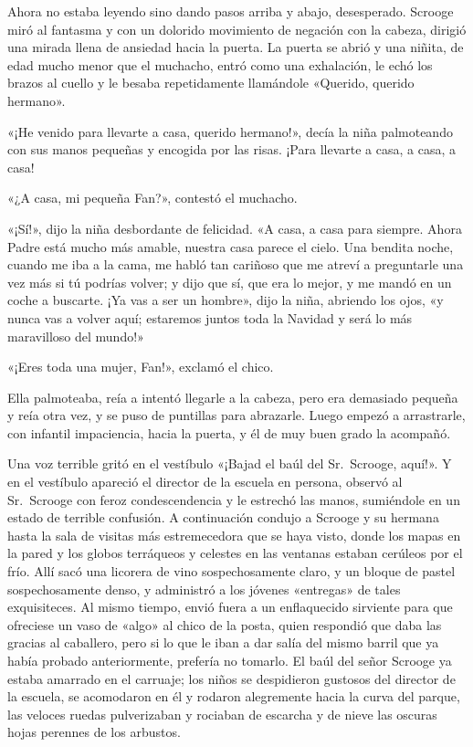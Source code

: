 \documentclass{novela}
\begin{document}
 Ahora no estaba leyendo sino dando pasos arriba y abajo, desesperado. Scrooge miró al fantasma y con un dolorido movimiento de negación con la cabeza, dirigió una mirada llena de ansiedad hacia la puerta. La puerta se abrió y una niñita, de edad mucho menor que el muchacho, entró como una exhalación, le echó los brazos al cuello y le besaba repetidamente llamándole «Querido, querido hermano».

 «¡He venido para llevarte a casa, querido hermano!», decía la niña palmoteando con sus manos pequeñas y encogida por las risas. ¡Para llevarte a casa, a casa, a casa!

 «¿A casa, mi pequeña Fan?», contestó el muchacho.

 «¡Sí!», dijo la niña desbordante de felicidad. «A casa, a casa para siempre. Ahora Padre está mucho más amable, nuestra casa parece el cielo. Una bendita noche, cuando me iba a la cama, me habló tan cariñoso que me atreví a preguntarle una vez más si tú podrías volver; y dijo que sí, que era lo mejor, y me mandó en un coche a buscarte. ¡Ya vas a ser un hombre», dijo la niña, abriendo los ojos, «y nunca vas a volver aquí; estaremos juntos toda la Navidad y será lo más maravilloso del mundo!»

 «¡Eres toda una mujer, Fan!», exclamó el chico.

 Ella palmoteaba, reía a intentó llegarle a la cabeza, pero era demasiado pequeña y reía otra vez, y se puso de puntillas para abrazarle. Luego empezó a arrastrarle, con infantil impaciencia, hacia la puerta, y él de muy buen grado la acompañó.

 Una voz terrible gritó en el vestíbulo «¡Bajad el baúl del Sr.~Scrooge, aquí!». Y en el vestíbulo apareció el director de la escuela en persona, observó al Sr.~Scrooge con feroz condescendencia y le estrechó las manos, sumiéndole en un estado de terrible confusión. A continuación condujo a Scrooge y su hermana hasta la sala de visitas más estremecedora que se haya visto, donde los mapas en la pared y los globos terráqueos y celestes en las ventanas estaban cerúleos por el frío. Allí sacó una licorera de vino sospechosamente claro, y un bloque de pastel sospechosamente denso, y administró a los jóvenes «entregas» de tales exquisiteces. Al mismo tiempo, envió fuera a un enflaquecido sirviente para que ofreciese un vaso de «algo» al chico de la posta, quien respondió que daba las gracias al caballero, pero si lo que le iban a dar salía del mismo barril que ya había probado anteriormente, prefería no tomarlo. El baúl del señor Scrooge ya estaba amarrado en el carruaje; los niños se despidieron gustosos del director de la escuela, se acomodaron en él y rodaron alegremente hacia la curva del parque, las veloces ruedas pulverizaban y rociaban de escarcha y de nieve las oscuras hojas perennes de los arbustos.
\end{document}
